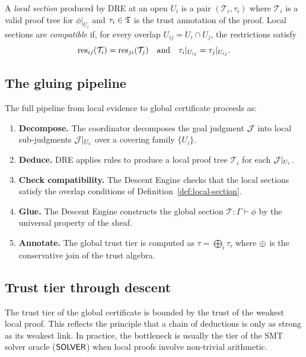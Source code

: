 \documentclass[11pt]{article}
\newcommand{\PTree}{\mathcal{T}}              %
\newcommand{\Prov}[2]{#1 \vdash #2}           %
\begin{document}
\begin{definition}\label{def:local-section}
A \emph{local section} produced by \textsc{DRE} at an open $U_i$ is a
pair $(\PTree_i, \tau_i)$ where $\PTree_i$ is a valid proof tree for
$\phi|_{U_i}$ and $\tau_i \in \mathfrak{T}$ is the trust annotation of the
proof.  Local sections are \emph{compatible} if, for every overlap
$U_{ij} = U_i \cap U_j$, the restrictions satisfy
\[
  \res_{ij}(\PTree_i) = \res_{ji}(\PTree_j)
\quad \text{and} \quad
  \tau_i|_{U_{ij}} = \tau_j|_{U_{ij}}.
\]
\end{definition}

\subsection{The gluing pipeline}

The full pipeline from local evidence to global certificate proceeds as:

\begin{enumerate}[leftmargin=2em]
  \item \textbf{Decompose.}  The coordinator decomposes the goal
    judgment $\mathcal{J}$ into local sub-judgments $\mathcal{J}|_{U_i}$ over a
    covering family $\{U_i\}$.
  \item \textbf{Deduce.}  \textsc{DRE} applies rules to produce a local
    proof tree $\PTree_i$ for each $\mathcal{J}|_{U_i}$.
  \item \textbf{Check compatibility.}  The Descent Engine checks that
    the local sections satisfy the overlap conditions of
    Definition~\ref{def:local-section}.
  \item \textbf{Glue.}  The Descent Engine constructs the global section
    $\PTree : \Prov{\Gamma}{\phi}$ by the universal property of the
    sheaf.
  \item \textbf{Annotate.}  The global trust tier is computed as
    $\tau = \bigoplus_i \tau_i$ where $\oplus$ is the conservative
    join of the trust algebra.
\end{enumerate}

\subsection{Trust tier through descent}

The trust tier of the global certificate is bounded by the trust of the
weakest local proof.  This reflects the principle that a chain of
deductions is only as strong as its weakest link.  In practice, the
bottleneck is usually the tier of the SMT solver oracle ($\mathsf{SOLVER}$)
when local proofs involve non-trivial arithmetic.
\end{document}
